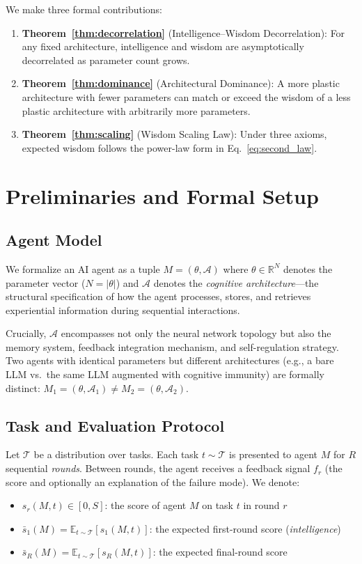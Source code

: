 \documentclass{article}
\newcommand{\cA}{\mathcal{A}}
\newcommand{\cT}{\mathcal{T}}
\newcommand{\R}{\mathbb{R}}
\newcommand{\E}{\mathbb{E}}
\begin{document}
We make three formal contributions:
\begin{enumerate}[leftmargin=*,itemsep=2pt]
    \item \textbf{Theorem~\ref{thm:decorrelation}} (Intelligence--Wisdom Decorrelation): For any fixed architecture, intelligence and wisdom are asymptotically decorrelated as parameter count grows.
    \item \textbf{Theorem~\ref{thm:dominance}} (Architectural Dominance): A more plastic architecture with fewer parameters can match or exceed the wisdom of a less plastic architecture with arbitrarily more parameters.
    \item \textbf{Theorem~\ref{thm:scaling}} (Wisdom Scaling Law): Under three axioms, expected wisdom follows the power-law form in Eq.~\ref{eq:second_law}.
\end{enumerate}

\section{Preliminaries and Formal Setup}
\label{sec:prelim}

\subsection{Agent Model}

We formalize an AI agent as a tuple $M = (\theta, \cA)$ where $\theta \in \R^N$ denotes the parameter vector ($N = |\theta|$) and $\cA$ denotes the \emph{cognitive architecture}---the structural specification of how the agent processes, stores, and retrieves experiential information during sequential interactions.

Crucially, $\cA$ encompasses not only the neural network topology but also the memory system, feedback integration mechanism, and self-regulation strategy.
Two agents with identical parameters but different architectures (e.g., a bare LLM vs.\ the same LLM augmented with cognitive immunity) are formally distinct: $M_1 = (\theta, \cA_1) \neq M_2 = (\theta, \cA_2)$.

\subsection{Task and Evaluation Protocol}

Let $\cT$ be a distribution over tasks.
Each task $t \sim \cT$ is presented to agent $M$ for $R$ sequential \emph{rounds}.
Between rounds, the agent receives a feedback signal $f_r$ (the score and optionally an explanation of the failure mode).
We denote:
\begin{itemize}[leftmargin=*,itemsep=1pt]
    \item $s_r(M, t) \in [0, S]$: the score of agent $M$ on task $t$ in round $r$
    \item $\bar{s}_1(M) = \E_{t \sim \cT}[s_1(M, t)]$: the expected first-round score (\emph{intelligence})
    \item $\bar{s}_R(M) = \E_{t \sim \cT}[s_R(M, t)]$: the expected final-round score
\end{itemize}
\end{document}
